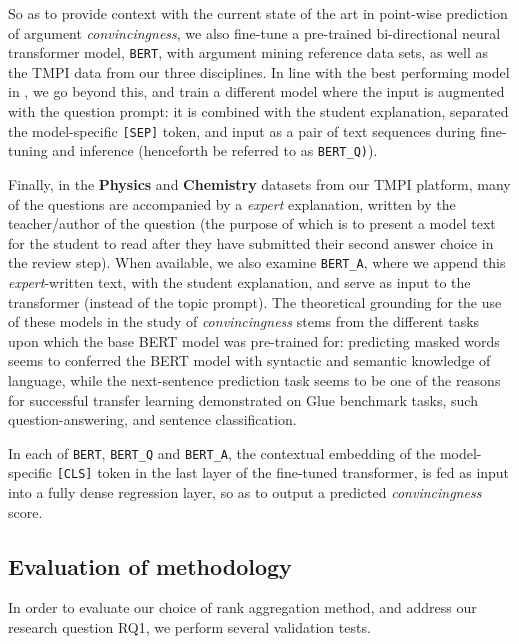 \documentclass[notitlepage,12pt]{jedm}
\begin{document}
So as to provide context with the current state of the art in point-wise 
prediction of argument \textit{convincingness}, we also fine-tune a pre-trained 
bi-directional neural transformer model, \verb|BERT|, with argument mining 
reference data sets, as well as the TMPI data from our three disciplines. 
In line with the best performing model in \cite{gretz_large-scale_2019}, we go 
beyond this, and train a different model where the input is augmented with the 
question prompt: it is combined with the student explanation, separated the 
model-specific \verb|[SEP]| token, and input as a pair of text sequences during 
fine-tuning and inference (henceforth be referred to as \verb|BERT_Q)|).

Finally, in the \textbf{Physics} and \textbf{Chemistry} datasets from our TMPI 
platform, many of the questions are accompanied by a \textit{expert} 
explanation, written by the teacher/author of the question (the purpose of 
which is to present a model text for the student to read after they have 
submitted their second answer choice in the review step).
When available, we also examine \verb|BERT_A|, where we append this 
\textit{expert}-written text, with the student explanation, and serve as input 
to the transformer (instead of the topic prompt).
The theoretical grounding for the use of these models in the study of 
\textit{convincingness} stems from the different tasks upon which the base BERT 
model was pre-trained for: predicting masked words seems to conferred the BERT 
model with syntactic and semantic knowledge of language, while the 
next-sentence prediction task seems to be one of the reasons for successful 
transfer learning demonstrated on Glue benchmark tasks, such 
question-answering, and sentence classification. 


In each of \verb|BERT|, \verb|BERT_Q| and \verb|BERT_A|, the contextual 
embedding of the model-specific \verb|[CLS]| token in the last layer of the 
fine-tuned transformer, is fed as input into a fully dense regression layer, so 
as to output a predicted \textit{convincingness} score.

 
\subsection{Evaluation of methodology}\label{sec:methodology_eval}

In order to evaluate our choice of rank aggregation method, and address our 
research question RQ1, we perform several validation tests.
\end{document}
